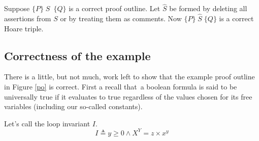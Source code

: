 \documentclass[muchmore,11pt]{article}%
\begin{document}
Suppose $\{P\}\;S$\ $\{Q\}$ is a correct proof outline. Let $\widehat{S}$ be
formed by deleting all assertions from $S$ or by treating them as comments.
Now $\{P\}\;\widehat{S}\;\{Q\}$ is a correct Hoare triple.

\subsection{Correctness of the example}

There is a little, but not much, work left to show that the example proof
outline in Figure \ref{po} is correct. First a recall that\ a boolean formula
is said to be universally true if it evaluates to true regardless of the
values chosen for its free variables (including our so-called constants).

Let's call the loop invariant $I$.%
\[
I\triangleq y\geq0\wedge X^{Y}=z\times x^{y}%
\]
\end{document}
